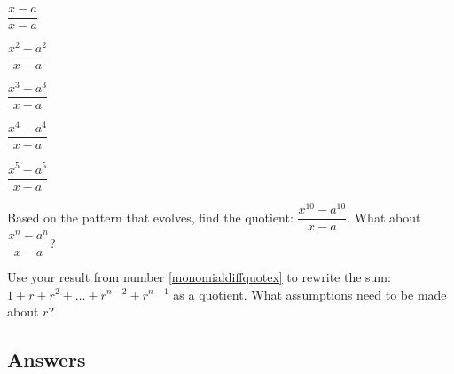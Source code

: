 \begin{exenum}
\begin{shortitemize}
\item $\dfrac{x - a}{x-a}$ 
\item $\dfrac{x^2 - a^2}{x-a}$ 
\item $\dfrac{x^3 - a^3}{x-a}$ 
\item $\dfrac{x^4 - a^4}{x-a}$ 
\item $\dfrac{x^5 - a^5}{x-a}$ 
\end{shortitemize}

Based on the pattern that evolves, find the quotient: $\dfrac{x^{10} - a^{10}}{x-a}$.  What about  $\dfrac{x^{n} - a^{n}}{x-a}$?


\item  \label{geoseriespreview} Use your result from number \ref{monomialdiffquotex} to rewrite the sum: $1 + r + r^2 + \dots + r^{n-2} + r^{n-1}$ as a quotient. What assumptions need to be made about $r$?

\end{exenum}

\clearpage

\subsection{Answers}
\startexenum

